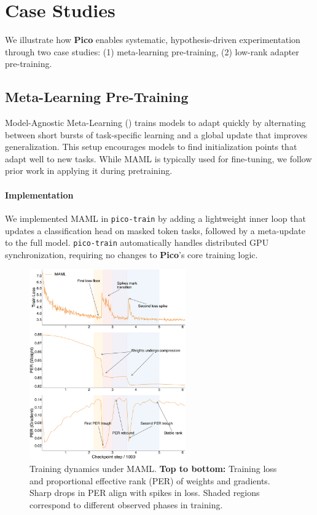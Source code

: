\section{Case Studies}


We illustrate how \textbf{Pico} enables systematic, hypothesis-driven experimentation through two case studies: (1) meta-learning pre-training, (2) low-rank adapter pre-training.

\subsection{Meta-Learning Pre-Training}

Model-Agnostic Meta-Learning (\citealp[MAML]{finn2017maml}) trains models to adapt quickly by alternating between short bursts of task-specific learning and a global update that improves generalization. This setup encourages models to find initialization points that adapt well to new tasks. While MAML is typically used for fine-tuning, we follow prior work \citep{bansal2020smlmt, li2021semisupervised} in applying it during pretraining.%


\paragraph{Implementation} We implemented MAML in \texttt{pico-train} by adding a lightweight inner loop that updates a classification head on masked token tasks, followed by a meta-update to the full model. \texttt{pico-train} automatically handles distributed GPU synchronization, requiring no changes to \textbf{Pico}'s core training logic.

\begin{figure}[h!]
    \centering
    \includegraphics[width=0.6\textwidth]{chapters/pico/figures/maml-example.pdf}
    \caption{Training dynamics under MAML.
    \textbf{Top to bottom:} Training loss and proportional effective rank (PER) of weights and gradients.
    Sharp drops in PER align with spikes in loss. Shaded regions correspond to different observed phases in training. 
    }
    \label{fig:maml_example}
\end{figure}


